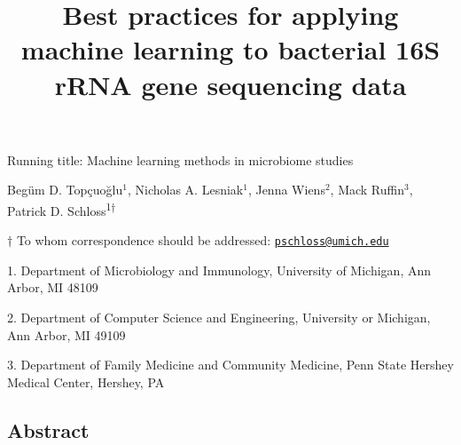 \documentclass[11pt,]{article}
\title{\textbf{Best practices for applying machine learning to bacterial 16S
rRNA gene sequencing data}}
\author{}
\date{}
\begin{document}
\maketitle

\vspace{35mm}

Running title: Machine learning methods in microbiome studies

\vspace{35mm}

Begüm D. Topçuoğlu\({^1}\), Nicholas A. Lesniak\({^1}\), Jenna
Wiens\({^2}\), Mack Ruffin\({^3}\), Patrick D.
Schloss\textsuperscript{1\(\dagger\)}

\vspace{40mm}

\(\dagger\) To whom correspondence should be addressed:
\href{mailto:pschloss@umich.edu}{\nolinkurl{pschloss@umich.edu}}

1. Department of Microbiology and Immunology, University of Michigan,
Ann Arbor, MI 48109

2. Department of Computer Science and Engineering, University or
Michigan, Ann Arbor, MI 49109

3. Department of Family Medicine and Community Medicine, Penn State
Hershey Medical Center, Hershey, PA

\newpage

\linenumbers

\subsection{Abstract}\label{abstract}
\end{document}
